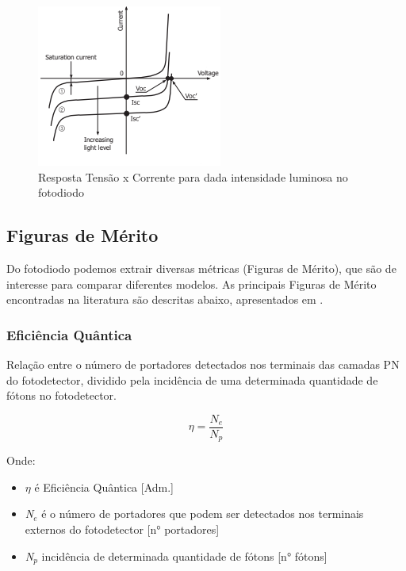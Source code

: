 \begin{figure}[htb]
	\caption{\label{fig_respFotodiodo}Resposta Tens\~ao x Corrente para dada intensidade luminosa no fotodiodo}
	\begin{center}
	    \includegraphics[scale=1]{Imagens/graficoRespostaFotodiodo.png}
	\end{center}
\end{figure}

\subsection{Figuras de M\'erito}
Do fotodiodo podemos extrair diversas m\'etricas (Figuras de M\'erito), que são de interesse para comparar diferentes modelos. As principais Figuras de M\'erito encontradas na literatura são descritas abaixo, apresentados em \cite{LidianeCampos}.

\subsubsection{Eficiência Quântica}
Relação entre o número de portadores detectados nos terminais das camadas PN do fotodetector, dividido pela incidência de uma determinada quantidade de fótons no fotodetector.

\begin{equation}
    \eta = \frac{N_e}{N_p}
\end{equation}

Onde:
\begin{itemize}
    \item \emph{$\eta$} \'e Efici\^encia Qu\^antica [Adm.]
    \item \emph{N$_e$} \'e o n\'umero de portadores que podem ser detectados nos terminais externos do fotodetector [n° portadores]
    \item \emph{N$_p$} incid\^encia de determinada quantidade de f\'otons [n° f\'otons]
\end{itemize}

